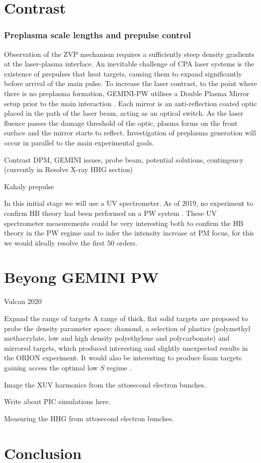 \section{Contrast}

\subsubsection{Preplasma scale lengths and prepulse control}
Observation of the ZVP mechanism requires a sufficiently steep density gradients at the laser-plasma interface. An inevitable challenge of \ac{CPA} laser systems is the existence of prepulses that heat targets, causing them to expand significantly before arrival of the main pulse. To increase the laser contrast, to the point where there is no preplasma formation, GEMINI-PW utilises a Double Plasma Mirror setup prior to the main interaction \cite{doumyCompleteCharacterizationPlasma2004}. Each mirror is an anti-reflection coated optic placed in the path of the laser beam, acting as an optical switch. As the laser fluence passes the damage threshold of the optic, plasma forms on the front surface and the mirror starts to reflect. Investigation of preplasma generation will occur in parallel to the main experimental goals.

Contrast DPM, GEMINI issues, probe beam, potential solutions, contingency (currently in Resolve X-ray HHG section)

Kahaly prepulse


In this initial stage we will use a UV spectrometer. As of 2019, no experiment to confirm HB theory had been performed on a PW system \cite{vincentiAchievingExtremeLight2019}. These UV spectrometer measurements could be very interesting both to confirm the HB theory in the PW regime and to infer the intensity increase at PM focus, for this we would ideally resolve the first 50 orders.


\section{Beyong GEMINI PW}
Vulcan 2020

Expand the range of targets A range of thick, flat solid targets are proposed to probe the density parameter space: diamond, a selection of plastics (polymethyl methacrylate, low and high density polyethylene and polycarbonate) and mirrored targets, which produced interesting and slightly unexpected results in the ORION experiment. It would also be interesting to produce foam targets gaining access the optimal low $S$ regime \cite{bataniPhysicsIssuesShock2014}.

Image the XUV harmonics from the attosecond electron bunches.

Write about PIC simulations here.

Measuring the HHG from attosecond electron bunches.


\section{Conclusion}







